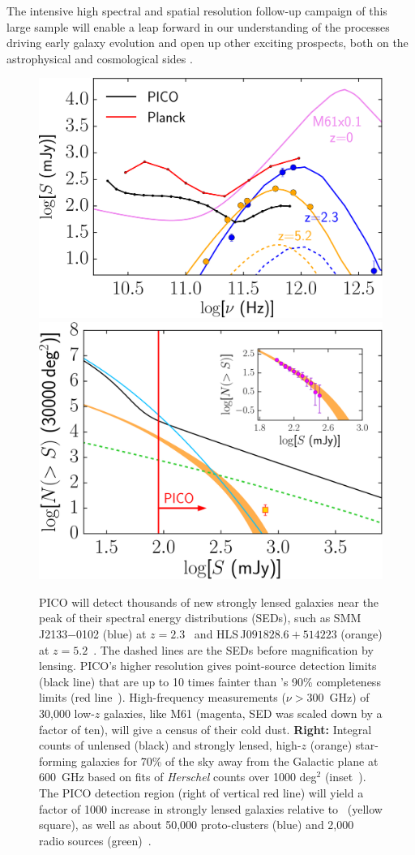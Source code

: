 \documentclass[PICOReport.tex]{subfiles}
\begin{document}
The intensive high spectral and spatial resolution follow-up campaign of this large sample will enable a leap forward in our understanding of the processes driving early galaxy evolution and open up other exciting prospects, both on the astrophysical and cosmological sides \cite[e.g.,][]{Treu2010}.
\begin{figure}[t]
\begin{center}
\includegraphics[width=0.416\columnwidth, trim={0 0 0 0cm}, clip]{images/fig_SED_PICO.pdf}
\hspace{0.75cm}
\includegraphics[width=0.4\columnwidth, trim={0 0 0 0cm}, clip]{images/NgtF_pico_NEWNEW.pdf}
\vskip-0.3cm
\caption{  PICO will detect thousands of new strongly lensed galaxies near the peak of their spectral energy distributions (SEDs), such as SMM\,J2133$-$0102 (blue)  at $z=2.3$~\cite{Swinbank2010} and HLS\,J$091828.6{+}514223$ (orange) at $z=5.2$~\cite{Combes2012}. The dashed lines are the SEDs before magnification by lensing. PICO's higher resolution gives point-source detection limits (black line) that are up to 10 times fainter than \planck 's 90\% completeness limits (red line~\cite{PCCS2}). High-frequency measurements ($\nu>300$~GHz) of 30,000 low-$z$ galaxies, like M61 (magenta, SED was scaled down by a factor of ten), will give a census of their cold dust.  {\bf Right:} Integral counts of unlensed (black) and strongly lensed, high-$z$ (orange) star-forming galaxies for 70\% of the sky away from the Galactic plane at 600~GHz based on fits of \textit{Herschel} counts over 1000 deg$^2$ (inset~\citep{Negrello2017lensed}). The PICO detection region (right of vertical red line) will yield a factor of 1000 increase in strongly lensed galaxies relative to \planck~(yellow square), as well as about 50,000 proto-clusters (blue) and 2,000 radio sources (green)~\citep{Negrello2017protocl}.}
\label{fig:SED3}
\end{center}
\vspace{-0.25in}
\end{figure}
\end{document}
